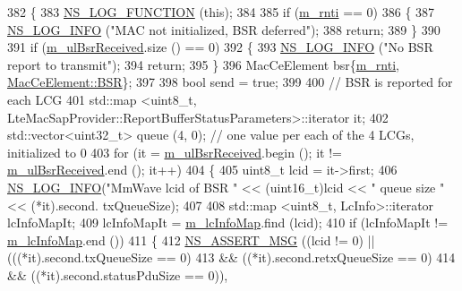 \begin{DoxyCode}
382 \{
383   \hyperlink{log-macros-disabled_8h_a90b90d5bad1f39cb1b64923ea94c0761}{NS\_LOG\_FUNCTION} (\textcolor{keyword}{this});
384 
385   \textcolor{keywordflow}{if} (\hyperlink{classns3_1_1MmWaveUeMac_a73d6bc08e75e3a20c5fbaf3113cf40f5}{m\_rnti} == 0)
386     \{
387       \hyperlink{group__logging_gafbd73ee2cf9f26b319f49086d8e860fb}{NS\_LOG\_INFO} (\textcolor{stringliteral}{"MAC not initialized, BSR deferred"});
388       \textcolor{keywordflow}{return};
389     \}
390 
391   \textcolor{keywordflow}{if} (\hyperlink{classns3_1_1MmWaveUeMac_a4fedb11c547b798c1546f082e147ba03}{m\_ulBsrReceived}.size () == 0)
392     \{
393       \hyperlink{group__logging_gafbd73ee2cf9f26b319f49086d8e860fb}{NS\_LOG\_INFO} (\textcolor{stringliteral}{"No BSR report to transmit"});
394       \textcolor{keywordflow}{return};
395     \}
396   MacCeElement bsr\{\hyperlink{classns3_1_1MmWaveUeMac_a73d6bc08e75e3a20c5fbaf3113cf40f5}{m\_rnti}, \hyperlink{structns3_1_1MacCeElement_a7b68183e7a7fd9b02783f92a2c645d7ba459101d6c51f15c22bfdf75d68f9c631}{MacCeElement::BSR}\};
397   
398   \textcolor{keywordtype}{bool} send = \textcolor{keyword}{true};
399 
400   \textcolor{comment}{// BSR is reported for each LCG}
401   std::map <uint8\_t, LteMacSapProvider::ReportBufferStatusParameters>::iterator it;
402   std::vector<uint32\_t> queue (4, 0); \textcolor{comment}{// one value per each of the 4 LCGs, initialized to 0}
403   \textcolor{keywordflow}{for} (it = \hyperlink{classns3_1_1MmWaveUeMac_a4fedb11c547b798c1546f082e147ba03}{m\_ulBsrReceived}.begin (); it != \hyperlink{classns3_1_1MmWaveUeMac_a4fedb11c547b798c1546f082e147ba03}{m\_ulBsrReceived}.end (); it++)
404     \{
405       uint8\_t lcid = it->first;
406       \hyperlink{group__logging_gafbd73ee2cf9f26b319f49086d8e860fb}{NS\_LOG\_INFO}(\textcolor{stringliteral}{"MmWave lcid of BSR "} << (uint16\_t)lcid << \textcolor{stringliteral}{" queue size "} << (*it).second.
      txQueueSize);
407 
408       std::map <uint8\_t, LcInfo>::iterator lcInfoMapIt;
409       lcInfoMapIt = \hyperlink{classns3_1_1MmWaveUeMac_a0797806054f43d23d0635440bcef7350}{m\_lcInfoMap}.find (lcid);
410       \textcolor{keywordflow}{if} (lcInfoMapIt !=  \hyperlink{classns3_1_1MmWaveUeMac_a0797806054f43d23d0635440bcef7350}{m\_lcInfoMap}.end ())
411       \{
412         \hyperlink{assert_8h_aff5ece9066c74e681e74999856f08539}{NS\_ASSERT\_MSG} ((lcid != 0) || (((*it).second.txQueueSize == 0)
413                                      && ((*it).second.retxQueueSize == 0)
414                                      && ((*it).second.statusPduSize == 0)),

\end{DoxyCode}
